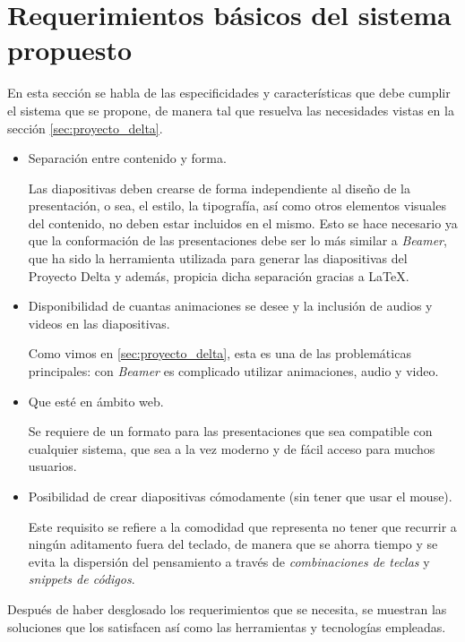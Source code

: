 	\section{Requerimientos básicos del sistema propuesto} %
	\label{sec:requerimientos_basicos_del_sistema_propuesto}
		En esta sección se habla de las especificidades y características que debe cumplir el sistema que se propone, de manera tal que resuelva las necesidades vistas en la sección \ref{sec:proyecto_delta}.
		\begin{itemize}
				\item Separación entre contenido y forma. 

					Las diapositivas deben crearse de forma independiente al diseño de la presentación, o sea, el estilo, la tipografía, así como otros elementos visuales del contenido, no deben estar incluidos en el mismo. Esto se hace necesario ya que la conformación de las presentaciones debe ser lo más similar a \textit{Beamer}, que ha sido la herramienta utilizada para generar las diapositivas del Proyecto Delta y además, propicia dicha separación gracias a \LaTeX{}.

				\item Disponibilidad de cuantas animaciones se desee y la inclusión de audios y videos en las diapositivas. 

					Como vimos en \ref{sec:proyecto_delta}, esta es una de las problemáticas principales: con \textit{Beamer} es complicado utilizar animaciones, audio y video.

				\item Que esté en ámbito web. 

					Se requiere de un formato para las presentaciones que sea compatible con cualquier sistema, que sea a la vez moderno y de fácil acceso para muchos usuarios.


				\item Posibilidad de crear diapositivas cómodamente (sin tener que usar el mouse). 

					Este requisito se refiere a la comodidad que representa no tener que recurrir a ningún aditamento fuera del teclado, de manera que se ahorra tiempo y se evita la dispersión del pensamiento a través de \textit{combinaciones de teclas} y \textit{snippets de códigos}.
		\end{itemize}	


	Después de haber desglosado los requerimientos que se necesita, se muestran las soluciones que los satisfacen así como las herramientas y tecnologías empleadas. 

